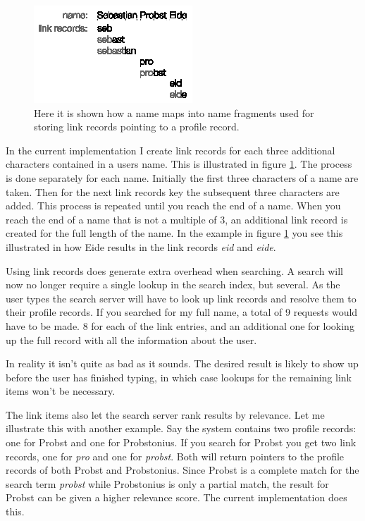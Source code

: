 \begin{figure}[!htb]
\begin{center}
	\includegraphics[width=0.6\linewidth]{illustrations/LinkRecords.eps}
  \caption{Here it is shown how a name maps into name fragments used for storing link records pointing to a profile record.}
  \label{figLinkRecord}
\end{center}
\end{figure}

In the current implementation I create link records for each three additional characters contained in a users name. This is illustrated in figure \ref{figLinkRecord}. The process is done separately for each name. Initially the first three characters of a name are taken. Then for the next link records key the subsequent three characters are added. This process is repeated until you reach the end of a name. When you reach the end of a name that is not a multiple of 3, an additional link record is created for the full length of the name. In the example in figure \ref{figLinkRecord} you see this illustrated in how Eide results in the link records \emph{eid} and \emph{eide}.

Using link records does generate extra overhead when searching. A search will now no longer require a single lookup in the search index, but several. As the user types the search server will have to look up link records and resolve them to their profile records. If you searched for my full name, a total of 9 requests would have to be made. 8 for each of the link entries, and an additional one for looking up the full record with all the information about the user. 

In reality it isn't quite as bad as it sounds. The desired result is likely to show up before the user has finished typing, in which case lookups for the remaining link items won't be necessary.

The link items also let the search server rank results by relevance. Let me illustrate this with another example. Say the system contains two profile records: one for Probst and one for Probstonius. If you search for Probst you get two link records, one for \emph{pro} and one for \emph{probst}. Both will return pointers to the profile records of both Probst and Probstonius. Since Probst is a complete match for the search term \emph{probst} while Probstonius is only a partial match, the result for Probst can be given a higher relevance score. The current implementation does this.

